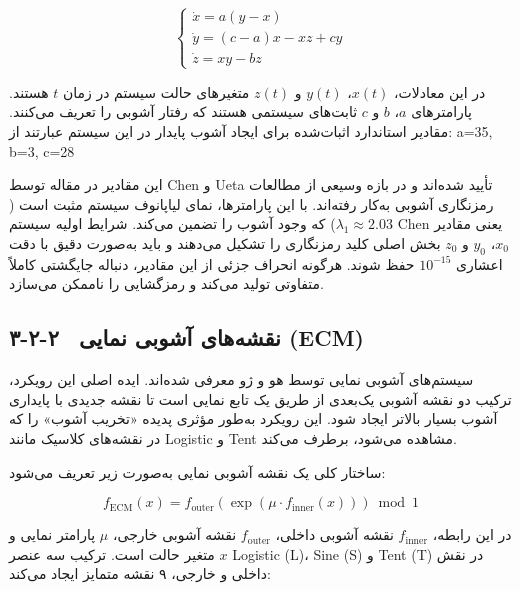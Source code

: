 \begin{equation}
\label{eq:ch3-chen}
\begin{cases}
\dot{x} = a(y-x) \\
\dot{y} = (c-a)x - xz + cy \\
\dot{z} = xy - bz
\end{cases}
\end{equation}

در این معادلات، $x(t)$، $y(t)$ و $z(t)$ متغیرهای حالت سیستم در زمان $t$ هستند. پارامترهای $a$، $b$ و $c$ ثابت‌های سیستمی هستند که رفتار آشوبی را تعریف می‌کنند. مقادیر استاندارد اثبات‌شده برای ایجاد آشوب پایدار در این سیستم عبارتند از: ‎a=35‎, ‎b=3‎, ‎c=28‎

این مقادیر در مقاله \cite{ref6} توسط ‎Chen‎ و ‎Ueta‎ تأیید شده‌اند و در بازه وسیعی از مطالعات رمزنگاری آشوبی به‌کار رفته‌اند. با این پارامترها، نمای لیاپانوف سیستم مثبت است ($\lambda_1 \approx 2.03$) که وجود آشوب را تضمین می‌کند. شرایط اولیه سیستم ‎Chen‎ یعنی مقادیر $x_0$، $y_0$ و $z_0$ بخش اصلی کلید رمزنگاری را تشکیل می‌دهند و باید به‌صورت دقیق با دقت اعشاری $10^{-15}$ حفظ شوند. هرگونه انحراف جزئی از این مقادیر، دنباله جایگشتی کاملاً متفاوتی تولید می‌کند و رمزگشایی را ناممکن می‌سازد.

\subsection{۳-۲-۲  نقشه‌های آشوبی نمایی (‎ECM‎)}

سیستم‌های آشوبی نمایی توسط هو و ژو \cite{ref4}معرفی شده‌اند. ایده اصلی این رویکرد، ترکیب دو نقشه آشوبی یک‌بعدی از طریق یک تابع نمایی است تا نقشه جدیدی با پایداری آشوب بسیار بالاتر ایجاد شود. این رویکرد به‌طور مؤثری پدیده «تخریب آشوب» را که در نقشه‌های کلاسیک مانند ‎Logistic‎ و ‎Tent‎ مشاهده می‌شود، برطرف می‌کند.

ساختار کلی یک نقشه آشوبی نمایی به‌صورت زیر تعریف می‌شود:

\begin{equation}
\label{eq:ch3-ecm}
f_{\mathrm{ECM}}(x) = f_{\mathrm{outer}}\!\left(\exp(\mu \cdot f_{\mathrm{inner}}(x))\right) \bmod 1
\end{equation}

در این رابطه، $f_{\mathrm{inner}}$ نقشه آشوبی داخلی، $f_{\mathrm{outer}}$ نقشه آشوبی خارجی، $\mu$ پارامتر نمایی و $x$ متغیر حالت است. ترکیب سه عنصر ‎Logistic‎ (‎L‎)، ‎Sine‎ (‎S‎) و ‎Tent‎ (‎T‎) در نقش داخلی و خارجی، ۹ نقشه متمایز ایجاد می‌کند:

